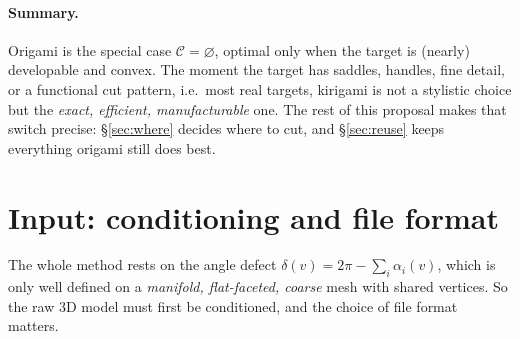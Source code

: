 \documentclass[11pt]{article}
\newcommand{\defect}{\delta}
\newcommand{\cut}{\mathcal{C}}
\begin{document}
\paragraph{Summary.} Origami is the special case $\cut=\varnothing$, optimal
only when the target is (nearly) developable and convex. The moment the
target has saddles, handles, fine detail, or a functional cut pattern,
i.e.\ most real targets, kirigami is not a stylistic choice but the
\emph{exact, efficient, manufacturable} one. The rest of this proposal makes
that switch precise: \S\ref{sec:where} decides where to cut, and
\S\ref{sec:reuse} keeps everything origami still does best.

\section{Input: conditioning and file format}\label{sec:input}
The whole method rests on the angle defect $\defect(v)=2\pi-\sum_i\alpha_i(v)$,
which is only well defined on a \emph{manifold, flat-faceted, coarse} mesh
with shared vertices. So the raw 3D model must first be conditioned, and the
choice of file format matters.
\end{document}
